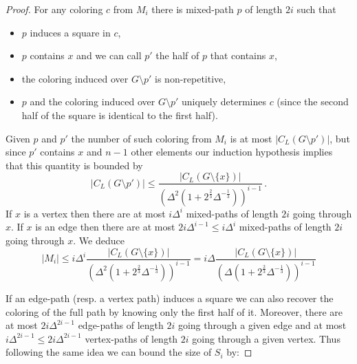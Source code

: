 \documentclass[a4paper,10pt]{article}
\begin{document}
\begin{proof}
For any coloring $c$ from $M_i$ there is mixed-path $p$ of length $2i$ such that 
\begin{itemize}
 \item $p$ induces a square in $c$,
 \item $p$ contains $x$ and we can call $p'$ the half of $p$ that contains $x$,
 \item the coloring induced over $G\setminus p'$ is non-repetitive,
 \item $p$ and the coloring induced over $G\setminus p'$ uniquely determines $c$ 
 (since the second half of the square is identical to the first half).
\end{itemize}

Given $p$ and $p'$ the number of such coloring from $M_i$ is at most
$|C_L(G\setminus p')|$, but since $p'$ contains $x$ and $n-1$ other elements our induction hypothesis implies that this quantity is bounded by
$$|C_L(G\setminus p')|\le \frac{|C_L(G\setminus \{x\})|}{(\Delta^2(1+2^{\frac{2}{3}}\Delta^{-\frac{1}{3}}))^{i-1}}\,.$$
If $x$ is a vertex then there are at most $i\Delta^i$ mixed-paths of length $2i$ going through $x$.
If $x$ is an edge then there are at most $2i\Delta^{i-1}\le i\Delta^i$ mixed-paths of length $2i$ going through $x$.
We deduce
$$|M_i|\le i\Delta^{i} \frac{|C_L(G\setminus \{x\})|}{(\Delta^2(1+2^{\frac{2}{3}}\Delta^{-\frac{1}{3}}))^{i-1}}= i\Delta \frac{|C_L(G\setminus \{x\})|}{(\Delta(1+2^{\frac{2}{3}}\Delta^{-\frac{1}{3}}))^{i-1}}$$

If an edge-path (resp. a vertex path) induces a square we can also recover the coloring of the full path
by knowing only the first half of it. Moreover, there are at most 
$2i\Delta^{2i-1}$ edge-paths of length $2i$ going through a given edge and at most
$i\Delta^{2i-1}\le2i\Delta^{2i-1}$ vertex-paths of length $2i$ going through a given vertex.
Thus following the same idea we can bound the size of $S_i$ by:


\end{proof}
\end{document}
